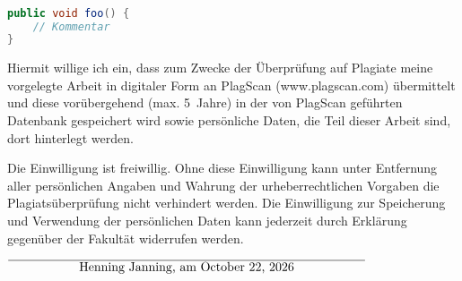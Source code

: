 \documentclass[12pt,oneside,a4paper,parskip]{scrbook}
\def\BaAuthor{Henning Janning}
\begin{document}
\begin{lstlisting}[label=lst:java,
				   language=java,
				   firstnumber=1,
				   caption=Beispiel für einen Quelltext]

public void foo() {
	// Kommentar
}
\end{lstlisting}








Hiermit willige ich ein, dass zum Zwecke der Überprüfung auf Plagiate meine vorgelegte Arbeit in digitaler Form an PlagScan (www.plagscan.com) übermittelt und diese vorübergehend (max. 5~Jahre) in der von PlagScan geführten Datenbank gespeichert wird sowie persönliche Daten, die Teil dieser Arbeit sind, dort hinterlegt werden.

\begin{small}
Die Einwilligung ist freiwillig. Ohne diese Einwilligung kann unter Entfernung aller persönlichen Angaben und Wahrung der urheberrechtlichen Vorgaben die Plagiatsüberprüfung nicht verhindert werden. Die Einwilligung zur Speicherung und Verwendung der persönlichen Daten kann jederzeit durch Erklärung gegenüber der Fakultät widerrufen werden.
\end{small}

\vspace{20pt}
\begin{flushright}
$\overline{~~~~~~~~~~~~~~~~~\mbox{\BaAuthor, am \today}~~~~~~~~~~~~~~~~~}$
\end{flushright}
\end{document}
